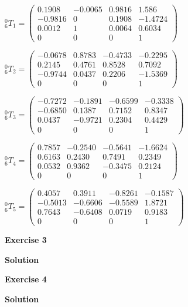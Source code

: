\documentclass[8pt]{article}
\begin{document}
\begin{list}{()~}{}
\item

$^0_6T_1 = \left( \begin{array}{cccc}
0.1908 & -0.0065 & 0.9816 & 1.586 \\
-0.9816  & 0 & 0.1908 & -1.4724 \\
0.0012  & 1 & 0.0064 & 0.6034 \\
0 & 0 & 0 & 1
\end{array} \right) $

$^0_6T_2 = \left( \begin{array}{cccc}
-0.0678 & 0.8783 &  -0.4733 & -0.2295 \\
 0.2145 & 0.4761 & 0.8528 & 0.7092 \\
-0.9744  & 0.0437 & 0.2206 & -1.5369 \\
0 & 0 & 0 & 1
\end{array} \right) $

$^0_6T_3 = \left( \begin{array}{cccc}
-0.7272 & -0.1891 &  -0.6599 & -0.3338 \\
-0.6850 & 0.1387 & 0.7152 & 0.8347 \\
0.0437 & -0.9721 & 0.2304 & 0.4429 \\
0 & 0 & 0 & 1
\end{array} \right) $

$^0_6T_4 = \left( \begin{array}{cccc}
0.7857  & -0.2540  & -0.5641 &  -1.6624 \\
0.6163  &  0.2430  &  0.7491 &  0.2349 \\
0.0532  &  0.9362  &  -0.3475&  0.2124 \\
0 & 0 & 0 & 1
\end{array} \right) $
    
$^0_6T_5 = \left( \begin{array}{cccc}
  0.4057  &  0.3911 &  -0.8261 &  -0.1587 \\
 -0.5013  & -0.6606 &  -0.5589 &  1.8721 \\
 0.7643   & -0.6408 &  0.0719  & 0.9183 \\
0 & 0 & 0 & 1
\end{array} \right) $

\newpage

\textbf{Exercise 3}		
		
\textbf{Solution}



\newpage

\textbf{Exercise 4}		
		
\textbf{Solution}


\end{list}
\end{document}
